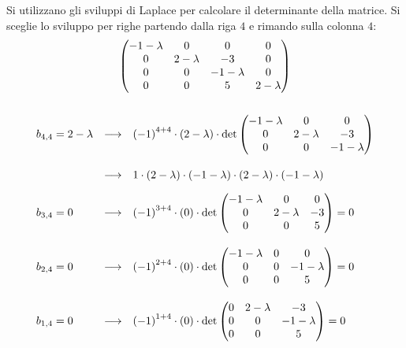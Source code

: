 \documentclass[a4paper]{article}
\makeatletter
\newenvironment{rowequmat}[1]{\left(\array{@{}#1@{}}}{\endarray\right)}
\makeatother
\begin{document}
	Si utilizzano gli sviluppi di Laplace per calcolare il determinante della matrice. Si sceglie lo sviluppo per righe partendo dalla riga $4$ e rimando sulla colonna $4$:
	\begin{gather*}
		\begin{rowequmat}{cccc}
				-1-\lambda	& 0			& 0				& 0 \\
					0		& 2-\lambda	& -3			& 0 \\
					0		& 0			& -1-\lambda	& 0 \\
					0		& 0			& 5				& 2-\lambda
		\end{rowequmat} \\
		\\
		\begin{array}{lll}
			b_{4,4} = 2-\lambda &\longrightarrow& \left(-1\right)^{4+4} \cdot \left(2-\lambda\right) \cdot \det
			\begin{rowequmat}{ccc}
				-1-\lambda	& 0			& 0			 \\
					0		& 2-\lambda	& -3		 \\
					0		& 0			& -1-\lambda 
			\end{rowequmat} \\[2.5em]
			&\longrightarrow& 1 \cdot \left(2-\lambda\right) \cdot \left(-1-\lambda\right) \cdot \left(2-\lambda\right) \cdot \left(-1-\lambda\right) \\ [1em]
			b_{3,4} = 0 		&\longrightarrow& \left(-1\right)^{3+4} \cdot \left(0\right) \cdot \det
			\begin{rowequmat}{ccc}
				-1-\lambda	& 0			& 0			 \\
					0		& 2-\lambda	& -3		 \\
					0		& 0			& 5 		 
			\end{rowequmat} = 0 \\[2.5em]
			b_{2,4} = 0 		&\longrightarrow& \left(-1\right)^{2+4} \cdot \left(0\right) \cdot \det
			\begin{rowequmat}{ccc}
				-1-\lambda	& 0			& 0				\\
					0		& 0			& -1-\lambda	\\
					0		& 0			& 5				
			\end{rowequmat} = 0 \\[2.5em]
			b_{1,4} = 0 		&\longrightarrow& \left(-1\right)^{1+4} \cdot \left(0\right) \cdot \det
			\begin{rowequmat}{ccc}
					0		& 2-\lambda	& -3			\\
					0		& 0			& -1-\lambda	\\
					0		& 0			& 5				
			\end{rowequmat} = 0 \\[2.5em]
		\end{array}
	\end{gather*}
\end{document}
